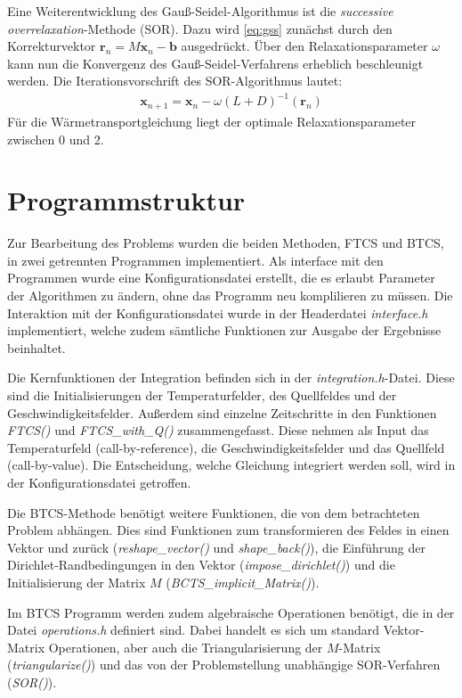 Eine Weiterentwicklung des Gauß-Seidel-Algorithmus ist die \emph{successive overrelaxation}-Methode (SOR). Dazu wird \cref{eq:gss} zunächst durch den Korrekturvektor $\boldsymbol r_n = M\boldsymbol x_n -\boldsymbol b$ ausgedrückt.
Über den Relaxationsparameter $\omega$ kann nun die Konvergenz des Gauß-Seidel-Verfahrens erheblich beschleunigt werden.
Die Iterationsvorschrift des SOR-Algorithmus lautet:
\begin{align}
  \boldsymbol x_{n+1} = \boldsymbol x_n - \omega (L+D)^{-1}(\boldsymbol r_n) \label{eq:sor}
\end{align}
Für die Wärmetransportgleichung liegt der optimale Relaxationsparameter zwischen 0 und 2.


\section{Programmstruktur}
Zur Bearbeitung des Problems wurden die beiden Methoden, FTCS und BTCS, in zwei getrennten Programmen implementiert. Als interface mit den Programmen wurde eine Konfigurationsdatei erstellt, die es erlaubt Parameter der Algorithmen zu ändern, ohne das Programm neu komplilieren zu müssen.
Die Interaktion mit der Konfigurationsdatei wurde in der Headerdatei \emph{interface.h} implementiert, welche zudem sämtliche Funktionen zur Ausgabe der Ergebnisse beinhaltet.

Die Kernfunktionen der Integration befinden sich in der \emph{integration.h}-Datei. Diese sind die Initialisierungen der Temperaturfelder, des Quellfeldes und der Geschwindigkeitsfelder.
Außerdem sind einzelne Zeitschritte in den Funktionen \emph{FTCS()} und \emph{FTCS\_with\_Q()} zusammengefasst. Diese nehmen als Input das Temperaturfeld (call-by-reference), die Geschwindigkeitsfelder und das Quellfeld (call-by-value).
Die Entscheidung, welche Gleichung integriert werden soll, wird in der Konfigurationsdatei getroffen.


Die BTCS-Methode benötigt weitere Funktionen, die von dem betrachteten Problem abhängen. Dies sind Funktionen zum transformieren des Feldes in einen Vektor und zurück (\emph{reshape\_vector()} und \emph{shape\_back()}), die Einführung der Dirichlet-Randbedingungen in den Vektor (\emph{impose\_dirichlet()}) und die Initialisierung der Matrix $M$ (\emph{BCTS\_implicit\_Matrix()}).

Im BTCS Programm werden zudem algebraische Operationen benötigt, die in der Datei \emph{operations.h} definiert sind.
Dabei handelt es sich um standard Vektor-Matrix Operationen, aber auch die Triangularisierung der $M$-Matrix (\emph{triangularize()}) und das von der Problemstellung unabhängige SOR-Verfahren (\emph{SOR()}).

